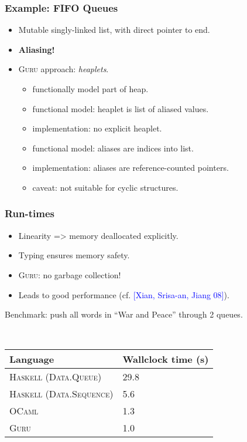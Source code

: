 \documentclass[11pt]{beamer}
\begin{document}
\begin{frame}
\frametitle{Example: FIFO Queues}

\begin{itemize}
\item Mutable singly-linked list, with direct pointer to end.
\item \textbf{Aliasing!}
\item \textsc{Guru} approach: \emph{heaplets}.
\begin{itemize}
\item functionally model part of heap.
\item functional model: heaplet is list of aliased values.
\item implementation: no explicit heaplet.
\item functional model: aliases are indices into list.
\item implementation: aliases are reference-counted pointers.
\item caveat: not suitable for cyclic structures.
\end{itemize}
\end{itemize}
\end{frame}

\begin{frame}
\frametitle{Run-times}

\begin{itemize}
\item Linearity => memory deallocated explicitly.
\item Typing ensures memory safety.
\item \textsc{Guru}: no garbage collection!
\item Leads to good performance (cf. \textcolor{blue}{[Xian, Srisa-an, Jiang 08]}).
\end{itemize}

\begin{center}
Benchmark: push all words in ``War and Peace'' through 2 queues.

\ 

\begin{tabular}{|l|l|}
\hline
\textbf{Language} & \textbf{Wallclock time (s)} \\
\hline
\textsc{Haskell (Data.Queue)} & 29.8 \\
\textsc{Haskell (Data.Sequence)} & 5.6 \\
\textsc{OCaml} & 1.3 \\
\textsc{Guru} & 1.0 \\
\hline
\end{tabular}
\end{center}

\end{frame}
\end{document}
